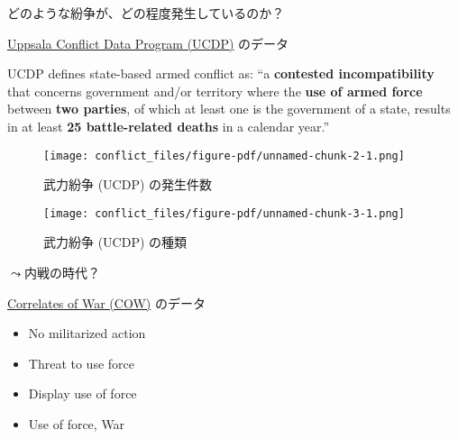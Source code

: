 \documentclass[
  xelatex,
  ja=standard]{bxjsarticle}
\providecommand{\tightlist}{%
  \setlength{\itemsep}{0pt}\setlength{\parskip}{0pt}}\usepackage{longtable,booktabs,array}
\begin{document}
どのような紛争が、どの程度発生しているのか？

\href{https://ucdp.uu.se/encyclopedia}{Uppsala Conflict Data Program
(UCDP)} のデータ\citep{gleditsch2002}

\begin{tcolorbox}[enhanced jigsaw, toprule=.15mm, colbacktitle=quarto-callout-note-color!10!white, bottomrule=.15mm, opacityback=0, breakable, left=2mm, opacitybacktitle=0.6, rightrule=.15mm, arc=.35mm, colframe=quarto-callout-note-color-frame, coltitle=black, titlerule=0mm, colback=white, toptitle=1mm, title=\textcolor{quarto-callout-note-color}{\faInfo}\hspace{0.5em}{\href{https://ucdp.uu.se/downloads/ucdpprio/ucdp-prio-acd-221.pdf}{UCDPにおける武力紛争の定義}}, leftrule=.75mm, bottomtitle=1mm]

UCDP defines state-based armed conflict as: ``a \textbf{contested
incompatibility} that concerns government and/or territory where the
\textbf{use of armed force} between \textbf{two parties}, of which at
least one is the government of a state, results in at least \textbf{25
battle-related deaths} in a calendar year.''

\end{tcolorbox}

\begin{figure}[htpb]

{\centering \texttt{[image: conflict\_files/figure-pdf/unnamed-chunk-2-1.png]}

}

\caption{武力紛争 (UCDP) の発生件数}

\end{figure}

\begin{figure}[htpb]

{\centering \texttt{[image: conflict\_files/figure-pdf/unnamed-chunk-3-1.png]}

}

\caption{武力紛争 (UCDP) の種類}

\end{figure}

\(\leadsto\)内戦の時代？

\href{https://correlatesofwar.org/data-sets/MIDs}{Correlates of War
(COW)} のデータ\citep{palmer2022}

\begin{itemize}
\tightlist
\item
  No militarized action
\item
  Threat to use force
\item
  Display use of force
\item
  Use of force, War
\end{itemize}
\end{document}
